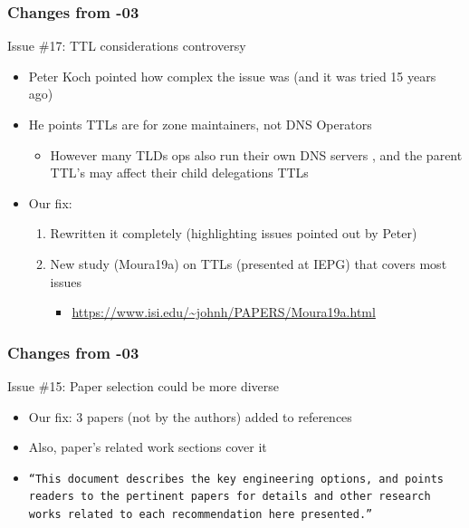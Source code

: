 \documentclass[11pt,show 
notes,notheorems,noamsthm,blank]{beamer} %
\begin{document}
\begin{frame}
\frametitle{Changes from -03}
\begin{block}{ Issue \#17: TTL considerations controversy }
\begin{itemize}
\item Peter Koch pointed how complex the issue was (and it was tried 15 years ago)
\item He points TTLs are for zone maintainers, not DNS Operators 
\begin{itemize}
 \item However many TLDs ops also run their own DNS servers
   , and the parent TTL's may affect their child delegations TTLs
 
\end{itemize}
\item Our fix:
\begin{enumerate}
 \item Rewritten  it completely (highlighting issues pointed out by Peter)
 \item New study (Moura19a) on TTLs (presented at IEPG) that covers most issues
  \begin{itemize}
  \item \url{https://www.isi.edu/~johnh/PAPERS/Moura19a.html}
 \end{itemize}

\end{enumerate}

\end{itemize} 

 
\end{block}
\end{frame}




\begin{frame}
\frametitle{Changes from -03}
\begin{block}{ Issue \#15: Paper selection could be more diverse}
\begin{itemize}
\item Our fix: 3 papers (not by the authors) added to references
\item Also, paper's related work sections cover it
\item \texttt{``This document describes the key engineering options, and points readers to the pertinent papers for details and other research works related to each recommendation here presented.''}
%  
%  
% 
% 
\end{itemize} 

 
\end{block}
\end{frame}
\end{document}
